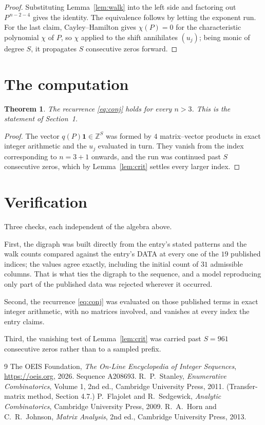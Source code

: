 \documentclass[11pt,a4paper]{article}
\theoremstyle{plain}
\newtheorem{theorem}{Theorem}
\theoremstyle{definition}
\begin{document}
\begin{proof}
Substituting Lemma~\ref{lem:walk} into the left side and factoring out
$P^{\,n-2-4}$ gives the identity. The equivalence follows by letting the exponent
run. For the last claim, Cayley--Hamilton gives $\chi(P)=0$ for the characteristic
polynomial $\chi$ of $P$, so $\chi$ applied to the shift annihilates $(u_j)$; being monic of
degree $S$, it propagates $S$ consecutive zeros forward.
\end{proof}

\section{The computation}

\begin{theorem}
The recurrence \eqref{eq:conj} holds for every $n>3$. This is the statement of
Section~1.
\end{theorem}

\begin{proof}
The vector $q(P)\mathbf{1}\in\mathbb{Z}^{S}$ was formed by $4$ matrix--vector
products in exact integer arithmetic and the $u_j$ evaluated in turn. They vanish from the
index corresponding to $n=3+1$ onwards, and the run was continued past $S$ consecutive
zeros, which by Lemma~\ref{lem:crit} settles every larger index.
\end{proof}

\section{Verification}

Three checks, each independent of the algebra above.

First, the digraph was built directly from the entry's stated patterns and the walk counts
compared against the entry's DATA at every one of the $19$ published indices; the
values agree exactly, including the initial count of $31$ admissible columns. That is
what ties the digraph to the sequence, and a model reproducing only part of the published
data was rejected wherever it occurred.

Second, the recurrence \eqref{eq:conj} was evaluated on those published terms in exact
integer arithmetic, with no matrices involved, and vanishes at every index the entry claims.

Third, the vanishing test of Lemma~\ref{lem:crit} was carried past $S=961$ consecutive
zeros rather than to a sampled prefix.

\begin{thebibliography}{9}
 The OEIS Foundation, \emph{The On-Line Encyclopedia of Integer
Sequences}, \url{https://oeis.org}, 2026. Sequence A208693.
 R.~P.~Stanley, \emph{Enumerative Combinatorics}, Volume 1, 2nd ed.,
Cambridge University Press, 2011. (Transfer-matrix method, Section 4.7.)
 P.~Flajolet and R.~Sedgewick, \emph{Analytic Combinatorics}, Cambridge
University Press, 2009.
 R.~A.~Horn and C.~R.~Johnson, \emph{Matrix Analysis}, 2nd ed., Cambridge
University Press, 2013.
\end{thebibliography}
\end{document}
